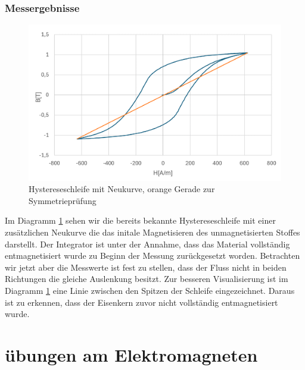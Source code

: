 \documentclass[a4paper,twoside,12pt,DIV=13,BCOR=5mm,numbers=noenddot,cleardoublepage=empty]{scrbook}
\begin{document}
\subsection{Messergebnisse}
\begin{figure}
  \includegraphics[width=\linewidth]{pictures/Neukurve.png}
  \caption{Hystereseschleife mit Neukurve, orange Gerade zur Symmetriepr\"ufung}
  \label{fig:neukurve}
\end{figure}
Im Diagramm \ref{fig:neukurve} sehen wir die bereits bekannte Hystereseschleife mit einer zus\"atzlichen Neukurve die das initale Magnetisieren des unmagnetisierten Stoffes darstellt.
 Der Integrator ist unter der Annahme, dass das Material vollst\"andig entmagnetisiert wurde zu Beginn der Messung zur\"uckgesetzt worden. Betrachten wir jetzt aber die Messwerte ist fest zu stellen, dass der Fluss nicht 
 in beiden Richtungen die gleiche Auslenkung besitzt. Zur besseren Visualisierung ist im Diagramm \ref{fig:neukurve} eine Linie zwischen den Spitzen der Schleife eingezeichnet. 
 Daraus ist zu erkennen, dass der Eisenkern zuvor nicht vollst\"andig entmagnetisiert wurde. 


 \chapter{\"ubungen am Elektromagneten}
\end{document}
